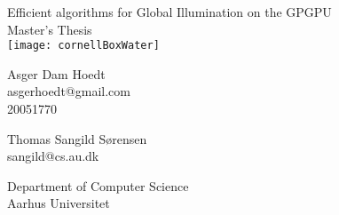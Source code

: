 \documentclass[a4paper,english]{report}
\begin{document}
\begin{titlepage}

\thispagestyle{empty}
\centering
{ \baselineskip=24pt
    \vspace*{80pt}
    {\LARGE Efficient algorithms for Global Illumination on the GPGPU}\\
    Master's Thesis
    \vspace*{20pt}
    \\
    \texttt{[image: cornellBoxWater]}
    \vspace*{40pt}
    \\
    \begin{minipage}{0.4\textwidth}
      \centering
      Asger Dam Hoedt \\ asgerhoedt@gmail.com \\ 20051770
    \end{minipage}
    \begin{minipage}{0.4\textwidth}
      \centering
      Thomas Sangild Sørensen \\ sangild@cs.au.dk
    \end{minipage}
}
\vfill
\small
Department of Computer Science\\
Aarhus Universitet
\end{titlepage}

\clearpage{}





\tableofcontents

\clearpage{}

















\clearpage
{}



\appendix


\end{document}
